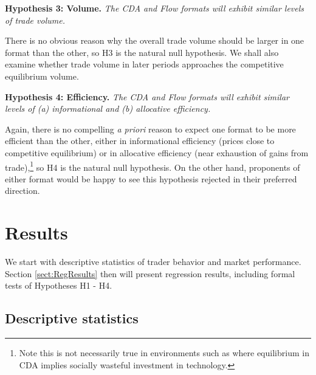 \vspace{0.3cm}
\noindent \textbf{Hypothesis 3: Volume.} \textit{The CDA and Flow formats will exhibit similar levels of trade volume. }

\noindent There is no obvious reason why the overall trade volume should be larger in one format than the other, so H3 is the natural null hypothesis. We shall also examine whether trade volume in later periods approaches the competitive equilibrium volume. 

\vspace{0.3cm}
\noindent \textbf{Hypothesis 4: Efficiency.} \textit{The CDA and Flow formats will exhibit similar levels of (a) informational and (b) allocative efficiency.} 

\noindent Again, there is no compelling \textit{a priori} reason to expect one format to be more efficient than the other, either in informational efficiency (prices close to competitive equilibrium) or in allocative efficiency (near exhaustion of gains from trade),\footnote{Note this is not necessarily true in environments such as \cite{Budish2015, Aldrich2019} where equilibrium in CDA implies socially wasteful investment in technology.}
so H4 is the natural null hypothesis.
On the other hand, proponents of either format would be happy to see this hypothesis rejected in their preferred direction.


\section{Results} \label{results}


We start with descriptive statistics of trader behavior and market performance. Section \ref{sect:RegResults} then will present regression results, including formal tests of Hypotheses H1 - H4.

\subsection{Descriptive statistics}

